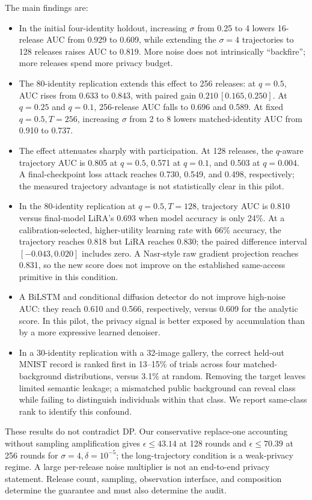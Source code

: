 \documentclass[conference]{IEEEtran}
\begin{document}
The main findings are:
\begin{itemize}
  \item In the initial four-identity holdout, increasing $\sigma$ from 0.25 to 4 lowers 16-release AUC from 0.929 to 0.609, while extending the $\sigma=4$ trajectories to 128 releases raises AUC to 0.819. More noise does not intrinsically ``backfire''; more releases spend more privacy budget.
  \item The 80-identity replication extends this effect to 256 releases: at $q=0.5$, AUC rises from 0.633 to 0.843, with paired gain $0.210\,[0.165,0.250]$. At $q=0.25$ and $q=0.1$, 256-release AUC falls to 0.696 and 0.589. At fixed $q=0.5,T=256$, increasing $\sigma$ from 2 to 8 lowers matched-identity AUC from 0.910 to 0.737.
  \item The effect attenuates sharply with participation. At 128 releases, the $q$-aware trajectory AUC is 0.805 at $q=0.5$, 0.571 at $q=0.1$, and 0.503 at $q=0.004$. A final-checkpoint loss attack reaches 0.730, 0.549, and 0.498, respectively; the measured trajectory advantage is not statistically clear in this pilot.
  \item In the 80-identity replication at $q=0.5,T=128$, trajectory AUC is 0.810 versus final-model LiRA's 0.693 when model accuracy is only 24\%. At a calibration-selected, higher-utility learning rate with 66\% accuracy, the trajectory reaches 0.818 but LiRA reaches 0.830; the paired difference interval $[-0.043,0.020]$ includes zero. A Nasr-style raw gradient projection reaches 0.831, so the new score does not improve on the established same-access primitive in this condition.
  \item A BiLSTM and conditional diffusion detector do not improve high-noise AUC: they reach 0.610 and 0.566, respectively, versus 0.609 for the analytic score. In this pilot, the privacy signal is better exposed by accumulation than by a more expressive learned denoiser.
  \item In a 30-identity replication with a 32-image gallery, the correct held-out MNIST record is ranked first in 13--15\% of trials across four matched-background distributions, versus 3.1\% at random. Removing the target leaves limited semantic leakage; a mismatched public background can reveal class while failing to distinguish individuals within that class. We report same-class rank to identify this confound.
\end{itemize}

These results do not contradict DP. Our conservative replace-one accounting without sampling amplification gives $\epsilon\leq 43.14$ at 128 rounds and $\epsilon\leq 70.39$ at 256 rounds for $\sigma=4,\delta=10^{-5}$; the long-trajectory condition is a weak-privacy regime. A large per-release noise multiplier is not an end-to-end privacy statement. Release count, sampling, observation interface, and composition determine the guarantee and must also determine the audit.
\end{document}
